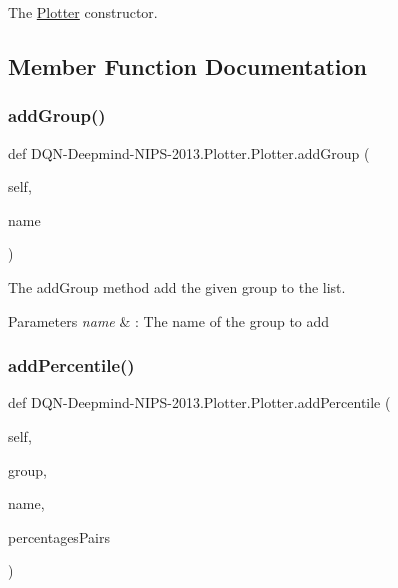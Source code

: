 The \hyperlink{classDQN-Deepmind-NIPS-2013_1_1Plotter_1_1Plotter}{Plotter} constructor. 



\subsection{Member Function Documentation}
\hypertarget{classDQN-Deepmind-NIPS-2013_1_1Plotter_1_1Plotter_a289c6002e292a7c4b60e335bddbd9ae0}{}\label{classDQN-Deepmind-NIPS-2013_1_1Plotter_1_1Plotter_a289c6002e292a7c4b60e335bddbd9ae0} 
\subsubsection{\texorpdfstring{add\+Group()}{addGroup()}}
{\footnotesize\ttfamily def D\+QN-\/Deepmind-\/N\+I\+PS-\/2013.Plotter.\+Plotter.\+add\+Group (\begin{DoxyParamCaption}\item[{}]{self,  }\item[{}]{name }\end{DoxyParamCaption})}



The add\+Group method add the given group to the list. 


\begin{DoxyParams}{Parameters}
{\em name} & \+: The name of the group to add \\
\hline
\end{DoxyParams}
\hypertarget{classDQN-Deepmind-NIPS-2013_1_1Plotter_1_1Plotter_ae8f20f0c734fc1447e4093638ac8b40f}{}\label{classDQN-Deepmind-NIPS-2013_1_1Plotter_1_1Plotter_ae8f20f0c734fc1447e4093638ac8b40f} 
\subsubsection{\texorpdfstring{add\+Percentile()}{addPercentile()}}
{\footnotesize\ttfamily def D\+QN-\/Deepmind-\/N\+I\+PS-\/2013.Plotter.\+Plotter.\+add\+Percentile (\begin{DoxyParamCaption}\item[{}]{self,  }\item[{}]{group,  }\item[{}]{name,  }\item[{}]{percentages\+Pairs }\end{DoxyParamCaption})}



